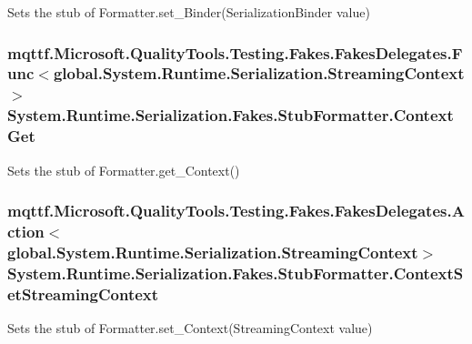 Sets the stub of Formatter.\-set\-\_\-\-Binder(\-Serialization\-Binder value)

\hypertarget{class_system_1_1_runtime_1_1_serialization_1_1_fakes_1_1_stub_formatter_a52215e5ba83f803039624cce18647079}{
\subsubsection[{Context\-Get}]{\setlength{\rightskip}{0pt plus 5cm}mqttf.\-Microsoft.\-Quality\-Tools.\-Testing.\-Fakes.\-Fakes\-Delegates.\-Func$<$global.\-System.\-Runtime.\-Serialization.\-Streaming\-Context$>$ System.\-Runtime.\-Serialization.\-Fakes.\-Stub\-Formatter.\-Context\-Get}}\label{class_system_1_1_runtime_1_1_serialization_1_1_fakes_1_1_stub_formatter_a52215e5ba83f803039624cce18647079}


Sets the stub of Formatter.\-get\-\_\-\-Context()

\hypertarget{class_system_1_1_runtime_1_1_serialization_1_1_fakes_1_1_stub_formatter_aa5660fcc1b967cb5dbbd16fb94849452}{
\subsubsection[{Context\-Set\-Streaming\-Context}]{\setlength{\rightskip}{0pt plus 5cm}mqttf.\-Microsoft.\-Quality\-Tools.\-Testing.\-Fakes.\-Fakes\-Delegates.\-Action$<$global.\-System.\-Runtime.\-Serialization.\-Streaming\-Context$>$ System.\-Runtime.\-Serialization.\-Fakes.\-Stub\-Formatter.\-Context\-Set\-Streaming\-Context}}\label{class_system_1_1_runtime_1_1_serialization_1_1_fakes_1_1_stub_formatter_aa5660fcc1b967cb5dbbd16fb94849452}


Sets the stub of Formatter.\-set\-\_\-\-Context(\-Streaming\-Context value)

